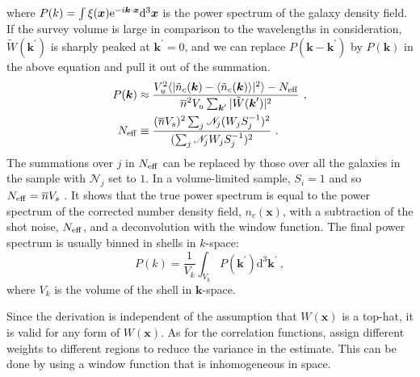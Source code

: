 \documentclass[12pt,a4paper]{article}
\renewcommand{\vec}[1]{\boldsymbol{#1}}
\newcommand{\dif}{\mathrm{d}}
\begin{document}
where $P(k) = \int \xi(\vec{x}) {\rm e}^{-i\vec{k}\cdot \vec{x}} \dif^3 \vec{x}$ is the power spectrum of the galaxy density field. If the survey volume is large in comparison to the wavelengths in consideration, $\tilde{W}(\vec{k}^\prime)$ is sharply peaked at $\vec{k}^\prime = 0$, and we can replace $P(\vec{k} -\vec{k}^\prime)$ by $P(\vec{k})$ in the above equation and pull it out of the summation. 
\begin{align}
P(\vec{k}) &\approx \dfrac{V_u^2 \langle |\tilde{n}_c(\vec{k}) - \langle\tilde{n}_c(\vec{k}) \rangle|^2 \rangle -N_{\rm eff}}{\overline{n}^2 V_u \sum_{\vec{k}^\prime} |\tilde{W}(\vec{k}^\prime)|^2} ~, \\
N_{\rm eff} &\equiv \dfrac{(\overline{n} V_s)^2  \sum_j \mathscr N_j (W_j S^{-1}_j)^2 }{(\sum_j \mathscr N_j W_j S^{-1}_j)^2} ~.
\end{align}
The summations over $j$ in $N_{\rm eff}$ can be replaced by those over all the galaxies in the sample with $\mathscr N_j$ set to $1$. In a volume-limited sample, $S_i = 1$ and so $N_{\rm eff} =\overline{n}V_s$ . It shows that the true power spectrum is equal to the power spectrum of the corrected number density field, $n_c(\vec{x})$, with a subtraction of the shot noise, $N_{\rm eff}$, and a deconvolution with the window function. The final power spectrum is usually binned in shells in $k$-space:
\begin{equation}
P(k) = \dfrac{1}{V_k} \int_{V_k} P(\vec{k}^\prime) \dif^3 \vec{k}^\prime ~,
\end{equation}
where $V_k$ is the volume of the shell in $\vec{k}$-space.

Since the derivation is independent of the assumption that $W(\vec{x})$ is a top-hat, it is valid for any form of $W(\vec{x})$. As for the correlation functions, assign different weights to different regions to reduce the variance in the estimate. This can be done by using a window function that is inhomogeneous in space.
\end{document}
